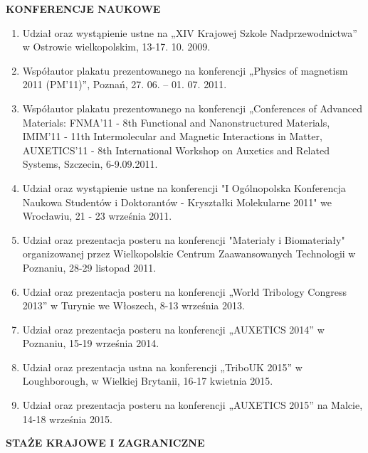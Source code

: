\documentclass[12pt,a4paper,openright]{report} %
\begin{document}
%
\textbf{KONFERENCJE NAUKOWE}
\begin{enumerate}
\item Udział oraz wystąpienie ustne na „XIV Krajowej Szkole Nadprzewodnictwa” w Ostrowie wielkopolskim, 13-17. 10. 2009.
\item Współautor plakatu prezentowanego na konferencji „Physics of magnetism 2011 (PM’11)”, Poznań, 27. 06. –  01. 07.  2011.
\item Współautor plakatu prezentowanego na konferencji  „Conferences of Advanced Materials: FNMA’11 - 8th Functional and Nanonstructured Materials, IMIM’11 - 11th Intermolecular and Magnetic Interactions in Matter, AUXETICS’11 - 8th International Workshop on Auxetics and Related Systems, Szczecin, 6-9.09.2011.
\item Udział oraz wystąpienie ustne na konferencji "I Ogólnopolska Konferencja Naukowa Studentów i Doktorantów - Kryształki Molekularne 2011" we Wrocławiu, 21 - 23 września 2011.
\item Udział oraz prezentacja posteru na konferencji "Materiały i Biomateriały" organizowanej przez Wielkopolskie Centrum Zaawansowanych Technologii w Poznaniu, 28-29 listopad 2011.
\item Udział oraz prezentacja posteru na konferencji „World Tribology Congress 2013” w Turynie we Włoszech, 8-13 września 2013.
\item Udział oraz prezentacja posteru na konferencji „AUXETICS 2014” w Poznaniu, 15-19 września 2014.
\item Udział oraz prezentacja ustna na konferencji „TriboUK 2015” w Loughborough, w Wielkiej Brytanii, 16-17 kwietnia 2015.
\item Udział oraz prezentacja posteru na konferencji „AUXETICS 2015” na Malcie, 14-18 września 2015.
\end{enumerate}
\textbf{STAŻE KRAJOWE I ZAGRANICZNE}
\end{document}

